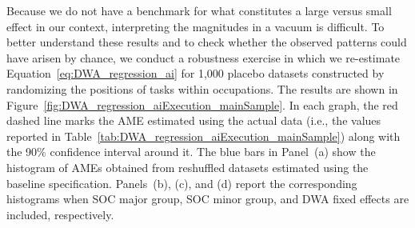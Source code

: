 Because we do not have a benchmark for what constitutes a large versus small effect in our context, interpreting the magnitudes in a vacuum is difficult.
To better understand these results and to check whether the observed patterns could have arisen by chance, we conduct a robustness exercise in which we re-estimate Equation~\eqref{eq:DWA_regression_ai} for 1,000 placebo datasets constructed by randomizing the positions of tasks within occupations.
The results are shown in Figure~\ref{fig:DWA_regression_aiExecution_mainSample}.
In each graph, the red dashed line marks the AME estimated using the actual data (i.e., the values reported in Table~\ref{tab:DWA_regression_aiExecution_mainSample}) along with the 90\% confidence interval around it.
The blue bars in Panel~(a) show the histogram of AMEs obtained from reshuffled datasets estimated using the baseline specification.
Panels~(b), (c), and (d) report the corresponding histograms when SOC major group, SOC minor group, and DWA fixed effects are included, respectively.

